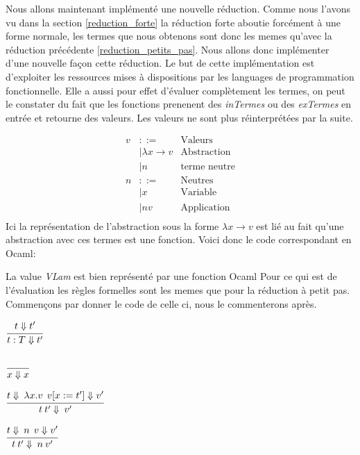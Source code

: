\documentclass {article}
\newcommand{\codefrom}[3]
           {}
\theoremstyle{definition}
\theoremstyle{remark}
\begin{document}
Nous allons maintenant implémenté une nouvelle réduction. 
Comme nous l'avons vu dans la section \ref{reduction_forte} %
la réduction forte aboutie forcément à une forme normale, les termes que nous obtenons
sont donc les memes qu'avec la réduction précédente \ref{reduction_petits_pas}. Nous allons donc implémenter 
d'une nouvelle façon cette réduction. Le but de cette implémentation est d'exploiter 
les ressources mises à dispositions par les languages de programmation fonctionnelle.
Elle a aussi pour effet d'évaluer complètement les termes, on peut le constater du fait %
que les fonctions prenenent des \emph{inTermes} ou des \emph{exTermes} en entrée et retourne des valeurs.
Les valeurs ne sont plus réinterprétées par la suite.

\begin{align*}
  v &::= &\mbox{Valeurs} \\
  &| \lambda x \rightarrow v &\mbox{Abstraction} \\
  &| n &\mbox{terme neutre} \\
  n &::= &\mbox{Neutres} \\
  &|x &\mbox{Variable} \\
  &|n v &\mbox{Application} \\
\end{align*}
Ici la représentation de l'abstraction sous la forme \(\lambda x\rightarrow v\)
est lié au fait qu'une abstraction avec ces termes est une fonction.
Voici donc le code correspondant en Ocaml:

\codefrom{typed}{lambda}{value}
\codefrom{typed}{lambda}{neutral}

La value \emph{VLam} est bien représenté par une fonction Ocaml
Pour ce qui est de l'évaluation les règles formelles sont les memes que pour 
la réduction à petit pas. 
Commençons par donner le code de celle ci, nous le commenterons après.


\codefrom{typed}{lambda}{big_step_eval_exTm_ann}
$\cfrac{t \Downarrow t'}
  {t:T \Downarrow t'}$

\codefrom{typed}{lambda}{big_step_eval_exTm_var}

$\cfrac{}
{x \Downarrow x}$

\codefrom{typed}{lambda}{big_step_eval_exTm_app}
\codefrom{typed}{lambda}{vapp}
$\cfrac{t \Downarrow \: \lambda x.v \:\: v[x := t']\Downarrow v'}
{t\:t'\Downarrow \: v'}$

$\cfrac{t \Downarrow \: n \:\: v \Downarrow v'}
{t\:t'\Downarrow \: n \: v'}$
  
\end{document}
